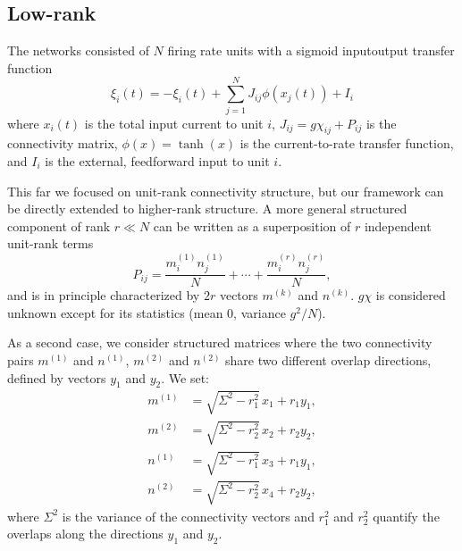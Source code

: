 \documentclass{article} %
\newcounter{ct}
\theoremstyle{definition}
\theoremstyle{remark}
\begin{document}
%


\subsection{Low-rank}\label{sec:supp:lowrank}


The networks consisted of \(N\) firing rate units with a sigmoid inputoutput transfer function \citep{mastrogiuseppe2018}
\begin{equation}
\xi_i(t) = - \xi_i(t) + \sum_{j=1}^{N} J_{ij}\phi(x_j(t)) + I_i
\label{eq:1}
\end{equation}
where \(x_i(t)\) is the total input current to unit \(i\),
\( J_{ij} = g\chi_{ij} + P_{ij}\) is the connectivity matrix,
\(\phi(x) = \tanh(x)\) is the current-to-rate transfer function, and \(I_i\) is the external, feedforward input to unit \(i\).

This far we focused on unit-rank connectivity structure, but our framework can be directly extended to higher-rank structure. A more general structured component of rank \(r\ll N\) can be written as a superposition of \(r\) independent unit-rank terms
\begin{equation}
P_{ij} = \frac{m^{(1)}_i n^{(1)}_j}{N} + \cdots + \frac{m^{(r)}_i n^{(r)}_j}{N},
\end{equation} and is in principle characterized by \(2r\) vectors \(m^{(k)}\) and \(n^{(k)}\).
\(g\chi\) is considered unknown except for its statistics (mean 0, variance \(g^2/N\)).

As a second case, we consider structured matrices where the two connectivity pairs \( m^{(1)} \) and \( n^{(1)} \), \( m^{(2)} \) and \( n^{(2)} \) share two different overlap directions, defined by vectors \( y_1 \) and \( y_2 \). We set:
\begin{align}
    m^{(1)} &= \sqrt{\Sigma^2 - r_1^2} \, x_1 + r_1 y_1, \\
    m^{(2)} &= \sqrt{\Sigma^2 - r_2^2} \, x_2 + r_2 y_2, \\
    n^{(1)} &= \sqrt{\Sigma^2 - r_1^2} \, x_3 + r_1 y_1, \\
    n^{(2)} &= \sqrt{\Sigma^2 - r_2^2} \, x_4 + r_2 y_2,
\end{align}
where \( \Sigma^2 \) is the variance of the connectivity vectors and \( r_1^2 \) and \( r_2^2 \) quantify the overlaps along the directions \( y_1 \) and \( y_2 \).
\end{document}
